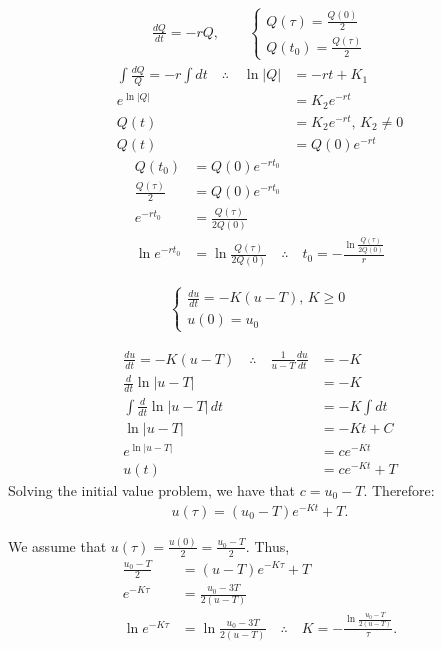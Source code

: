 \begin{solution}
	\begin{gather*}
		\frac{dQ}{dt}=-rQ, \qquad
		\begin{cases}
			Q(\tau)=\frac{Q(0)}{2}\\
			Q(t_0)=\frac{Q(\tau)}{2}
		\end{cases}
	\end{gather*}
	\begin{align*}
		\int \frac{dQ}{Q}=-r\int dt \quad \therefore \quad
		\ln|Q|&=-rt+K_1\\
		e^{\ln|Q|}&=K_2e^{-rt}\\
		Q(t)&=K_2e^{-rt},\, K_2 \neq 0\\
		Q(t)&=Q(0)e^{-rt}
	\end{align*}
	\begin{align*}
		Q(t_0)&=Q(0)e^{-rt_0}\\
		\frac{Q(\tau)}{2}&=Q(0)e^{-rt_0}\\
		e^{-rt_0}&=\frac{Q(\tau)}{2Q(0)}\\
		\ln e^{-rt_0}&=\ln \frac{Q(\tau)}{2Q(0)} \quad \therefore \quad \boxed{t_0=-\frac{\ln \frac{Q(\tau)}{2Q(0)}}{r}}
	\end{align*}
\end{solution}

\begin{solution}
	\begin{gather*}
		\begin{cases}
			\frac{du}{dt}=-K(u-T),\, K \geq 0\\
			u(0)=u_0
		\end{cases}
	\end{gather*}
	\begin{solparts}
		\item
		\begin{align*}
			\frac{du}{dt}=-K(u-T) \quad \therefore \quad \frac{1}{u-T}\frac{du}{dt}&=-K\\
			\frac{d}{dt}\ln|u-T|&=-K\\
			\int \frac{d}{dt}\ln|u-T|\, dt&=-K \int dt\\
			\ln|u-T|&=-Kt+C\\
			e^{\ln|u-T|}&=ce^{-Kt}\\
			u(t)&=ce^{-Kt}+T
		\end{align*}
		Solving the initial value problem, we have that $c=u_0-T$. Therefore:
		\begin{gather*}
			\boxed{u(\tau)=(u_0-T)e^{-Kt}+T}.
		\end{gather*}
		
		\item
		We assume that $u(\tau)=\frac{u(0)}{2}=\frac{u_0-T}{2}$. Thus,
		\begin{align*}
			\frac{u_0-T}{2}&=(u-T)e^{-K\tau}+T\\
			e^{-K\tau}&=\frac{u_0-3T}{2(u-T)}\\
			\ln e^{-K\tau}&=\ln \frac{u_0-3T}{2(u-T)}\quad \therefore \quad \boxed{K=-\frac{\ln \frac{u_0-T}{2(u-T)}}{\tau}}.
		\end{align*}
	\end{solparts}
\end{solution}

